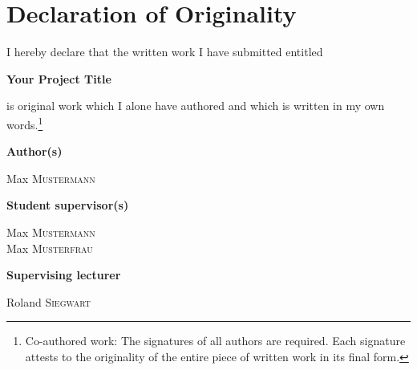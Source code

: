 
\section*{Declaration of Originality}

I hereby declare that the written work I have submitted entitled

\vspace{0.5cm}

\textbf{Your Project Title}

\vspace{0.5cm}

is original work which I alone have authored and which is written in my own words.\footnote{Co-authored work: The signatures of all authors are required. Each signature attests to the originality of the entire piece of written work in its final form.}

\begin{multicols}{2}
\vspace{0.5cm}
    \textbf{Author(s)}
    \vspace{0.2cm}
    
    Max \textsc{Mustermann} \\
    
    \vfill\null
    \columnbreak

    \textbf{Student supervisor(s)}
    \vspace{0.2cm}
    
    Max \textsc{Mustermann} \\
    Max \textsc{Musterfrau}\\
    
    \vspace{0.2cm}
    
    \textbf{Supervising lecturer}
    
    \vspace{0.2cm}
    
    Roland \textsc{Siegwart}
    
    \vspace{1cm}
    
    \end{multicols}

